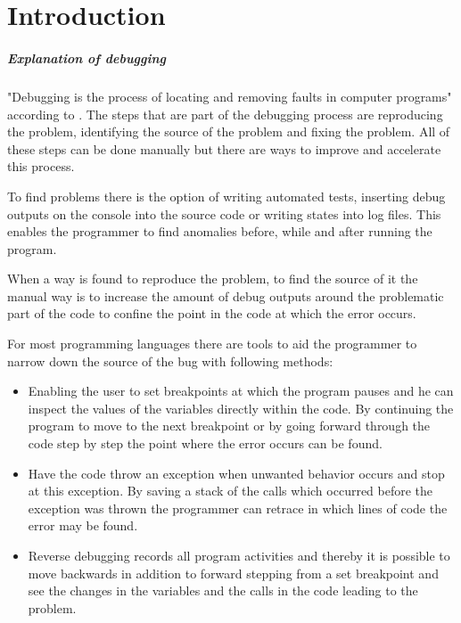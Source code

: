 
\chapter{Introduction}\label{cha:Introduction}

\paragraph{Explanation of debugging}
\label{paragraph:debuging}

"Debugging is the process of locating and removing faults in computer programs" according to . The steps that are part of the debugging process are reproducing the problem, identifying the source of the problem and fixing the problem. All of these steps can be done manually but there are ways to improve and accelerate this process.

To find problems there is the option of writing automated tests, inserting debug outputs on the console into the source code or writing states into log files. This enables the programmer to find anomalies before, while and after running the program.

When a way is found to reproduce the problem, to find the source of it the manual way is to increase the amount of debug outputs around the problematic part of the code to confine the point in the code at which the error occurs.

For most programming languages there are tools to aid the programmer to narrow down the source of the bug with following methods:

\begin{itemize}

\item Enabling the user to set breakpoints at which the program pauses and he can inspect the values of the variables directly within the code. By continuing the program to move to the next breakpoint or by going forward through the code step by step the point where the error occurs can be found.


\item Have the code throw an exception when unwanted behavior occurs and stop at this exception. By saving a stack of the calls which occurred before the exception was thrown the programmer can retrace in which lines of code the error may be found.


\item Reverse debugging records all program activities and thereby it is possible to move backwards in addition to forward stepping from a set breakpoint and see the changes in the variables and the calls in the code leading to the problem.

\end{itemize}

